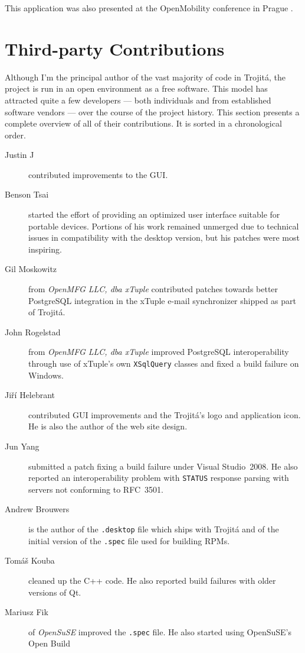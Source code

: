 \documentclass[trojita]{subfiles}
\begin{document}
This application was also presented at the OpenMobility conference in Prague \cite{trojita-openmobility}.

\newpage
\section{Third-party Contributions}

Although I'm the principal author of the vast majority of code in Trojitá, the project is run in an open environment as
a free software.  This model has attracted quite a few developers --- both individuals and from established software
vendors --- over the course of the project history.  This section presents a complete overview of all of their
contributions.  It is sorted in a chronological order.

\begin{description}
  \item[Justin J] contributed improvements to the GUI.
  \item[Benson Tsai] started the effort of providing an optimized user interface suitable for portable devices.
    Portions of his work remained unmerged due to technical issues in compatibility with the desktop version, but his
    patches were most inspiring.
  \item[Gil Moskowitz] from {\em OpenMFG LLC, dba xTuple} contributed patches towards better PostgreSQL integration in
    the xTuple e-mail synchronizer shipped as part of Trojitá.
  \item[John Rogelstad] from {\em OpenMFG LLC, dba xTuple} improved PostgreSQL interoperability through use of xTuple's
    own {\tt XSqlQuery} classes and fixed a build failure on Windows.
  \item[Jiří Helebrant] contributed GUI improvements and the Trojitá's logo and application icon.  He is also the author
    of the web site design.
  \item[Jun Yang] submitted a patch fixing a build failure under Visual Studio~2008.  He also reported an
    interoperability problem with {\tt STATUS} response parsing with servers not conforming to RFC~3501.
  \item[Andrew Brouwers] is the author of the {\tt .desktop} file which ships with Trojitá and of the initial version of
    the {\tt .spec} file used for building RPMs.
  \item[Tomáš Kouba] cleaned up the C++ code.  He also reported build failures with older versions of Qt.
  \item[Mariusz Fik] of {\em OpenSuSE} improved the {\tt .spec} file.  He also started using OpenSuSE's Open Build

\end{description}
\end{document}
